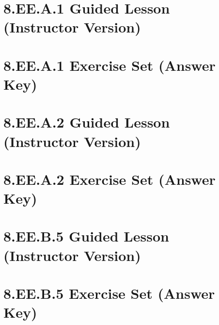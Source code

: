 \documentclass[a4paper,12pt]{article}
\title{}
\date{}
\begin{document}

\newpage

\hypertarget{toc}{}
\tableofcontents
\newpage

\pagestyle{main}

\newpage
\section{8.EE.A.1 Guided Lesson (Instructor Version)}


\newpage
\section{8.EE.A.1 Exercise Set (Answer Key)}


\newpage
\section{8.EE.A.2 Guided Lesson (Instructor Version)}


\newpage
\section{8.EE.A.2 Exercise Set (Answer Key)}


\newpage
\section{8.EE.B.5 Guided Lesson (Instructor Version)}


\newpage
\section{8.EE.B.5 Exercise Set (Answer Key)}

\end{document}
